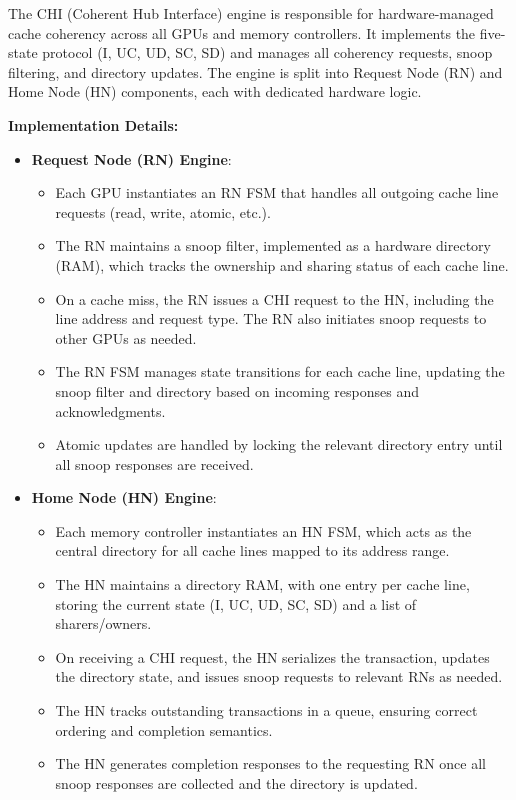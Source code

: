 \documentclass[11pt,a4paper]{article}
\begin{document}
The CHI (Coherent Hub Interface) engine is responsible for hardware-managed cache coherency across all GPUs and memory controllers. It implements the five-state protocol (I, UC, UD, SC, SD) and manages all coherency requests, snoop filtering, and directory updates. The engine is split into Request Node (RN) and Home Node (HN) components, each with dedicated hardware logic.

\textbf{Implementation Details:}
\begin{itemize}
    \item \textbf{Request Node (RN) Engine}:
    \begin{itemize}
        \item Each GPU instantiates an RN FSM that handles all outgoing cache line requests (read, write, atomic, etc.).
        \item The RN maintains a snoop filter, implemented as a hardware directory (RAM), which tracks the ownership and sharing status of each cache line.
        \item On a cache miss, the RN issues a CHI request to the HN, including the line address and request type. The RN also initiates snoop requests to other GPUs as needed.
        \item The RN FSM manages state transitions for each cache line, updating the snoop filter and directory based on incoming responses and acknowledgments.
        \item Atomic updates are handled by locking the relevant directory entry until all snoop responses are received.
    \end{itemize}
    \item \textbf{Home Node (HN) Engine}:
    \begin{itemize}
        \item Each memory controller instantiates an HN FSM, which acts as the central directory for all cache lines mapped to its address range.
        \item The HN maintains a directory RAM, with one entry per cache line, storing the current state (I, UC, UD, SC, SD) and a list of sharers/owners.
        \item On receiving a CHI request, the HN serializes the transaction, updates the directory state, and issues snoop requests to relevant RNs as needed.
        \item The HN tracks outstanding transactions in a queue, ensuring correct ordering and completion semantics.
        \item The HN generates completion responses to the requesting RN once all snoop responses are collected and the directory is updated.

\end{itemize}
\end{itemize}
\end{document}
